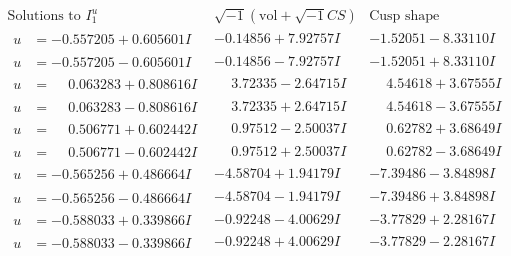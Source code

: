 \documentclass[1p]{elsarticle_modified}
\theoremstyle{definition}
\newcommand{\I}{\sqrt{-1}}
\begin{document}
$$\begin{array}{c|c|c}  
\text{Solutions to }I^u_{1}& \I (\text{vol} + \sqrt{-1}CS) & \text{Cusp shape}\\
 \hline 
\begin{aligned}
u &= -0.557205 + 0.605601 I\end{aligned}
 & -0.14856 + 7.92757 I & -1.52051 - 8.33110 I \\ \hline\begin{aligned}
u &= -0.557205 - 0.605601 I\end{aligned}
 & -0.14856 - 7.92757 I & -1.52051 + 8.33110 I \\ \hline\begin{aligned}
u &= \phantom{-}0.063283 + 0.808616 I\end{aligned}
 & \phantom{-}3.72335 - 2.64715 I & \phantom{-}4.54618 + 3.67555 I \\ \hline\begin{aligned}
u &= \phantom{-}0.063283 - 0.808616 I\end{aligned}
 & \phantom{-}3.72335 + 2.64715 I & \phantom{-}4.54618 - 3.67555 I \\ \hline\begin{aligned}
u &= \phantom{-}0.506771 + 0.602442 I\end{aligned}
 & \phantom{-}0.97512 - 2.50037 I & \phantom{-}0.62782 + 3.68649 I \\ \hline\begin{aligned}
u &= \phantom{-}0.506771 - 0.602442 I\end{aligned}
 & \phantom{-}0.97512 + 2.50037 I & \phantom{-}0.62782 - 3.68649 I \\ \hline\begin{aligned}
u &= -0.565256 + 0.486664 I\end{aligned}
 & -4.58704 + 1.94179 I & -7.39486 - 3.84898 I \\ \hline\begin{aligned}
u &= -0.565256 - 0.486664 I\end{aligned}
 & -4.58704 - 1.94179 I & -7.39486 + 3.84898 I \\ \hline\begin{aligned}
u &= -0.588033 + 0.339866 I\end{aligned}
 & -0.92248 - 4.00629 I & -3.77829 + 2.28167 I \\ \hline\begin{aligned}
u &= -0.588033 - 0.339866 I\end{aligned}
 & -0.92248 + 4.00629 I & -3.77829 - 2.28167 I \\ \hline\begin{aligned}

\end{aligned}
\end{array}$$
\end{document}
